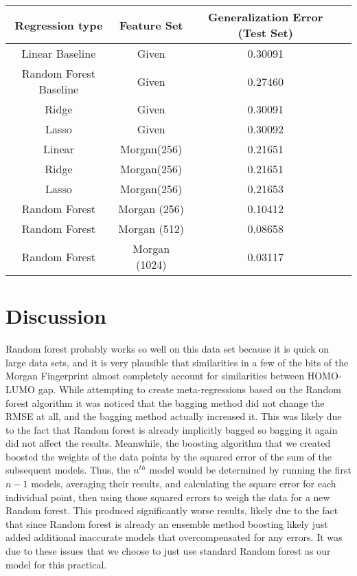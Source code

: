\documentclass[11pt]{article}
\begin{document}
\begin{center}
\begin{tabular}{|c|c|c|c|}
\hline
Regression type & Feature Set & Generalization Error (Test Set)\\
\hline
Linear Baseline &Given & 0.30091\\
Random Forest Baseline & Given& 0.27460\\
Ridge & Given& 0.30091\\
Lasso &Given& 0.30092\\
Linear&Morgan(256)& 0.21651\\
Ridge&Morgan(256)& 0.21651\\
Lasso&Morgan(256)& 0.21653 \\
Random Forest&Morgan (256)& 0.10412\\
Random Forest&Morgan (512)& 0.08658\\
Random Forest&Morgan (1024)& 0.03117\\
\hline
\end{tabular}
\end{center}



\section{Discussion}
Random forest probably works so well on this data set because it is quick on large data sets, and it is very plausible that similarities in a few of the bits of the Morgan Fingerprint almost completely account for similarities between HOMO-LUMO gap.
While attempting to create meta-regressions based on the Random forest algorithm it was noticed that the bagging method did not change the RMSE at all, and the bagging method actually increased it. This was likely due to the fact that Random forest is already implicitly bagged so bagging it again did not affect the results. Meanwhile, the boosting algorithm that we created boosted the weights of the data points by the squared error of the sum of the subsequent models. Thus, the $n^{th}$ model would be determined by running the first $n-1$ models, averaging their results, and calculating the square error for each individual point, then using those squared errors to weigh the data for a new Random forest. This produced significantly worse results, likely due to the fact that since Random forest is already an ensemble method boosting likely just added additional inaccurate models that overcompensated for any errors. It was due to these issues that we choose to just use standard Random forest as our model for this practical.
\end{document}
